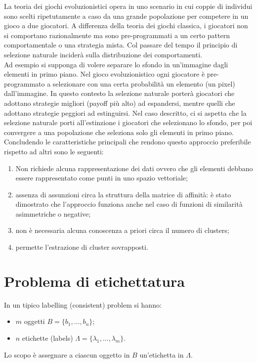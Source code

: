 	La teoria dei giochi evoluzionistici opera in uno scenario in cui coppie di individui sono scelti ripetutamente a caso da una grande popolazione per competere in un gioco a due giocatori. A differenza della teoria dei giochi classica, i giocatori non si comportano razionalmente ma sono pre-programmati a un certo pattern comportamentale o una strategia mista. Col passare del tempo il principio di selezione naturale inciderà sulla distribuzione dei comportamenti.\\

	Ad esempio si supponga di volere separare lo sfondo in un'immagine dagli elementi in primo piano. Nel gioco evoluzionistico ogni giocatore è pre-programmato a selezionare con una certa probabilità un elemento (un pixel) dall'immagine. In questo contesto la selezione naturale porterà giocatori che adottano strategie migliori (payoff più alto) ad espandersi, mentre quelli che adottano strategie peggiori ad estinguirsi. Nel caso descritto, ci si aspetta che la selezione naturale porti all'estinzione i giocatori che selezionano lo sfondo, per poi convergere a una popolazione che seleziona solo gli elementi in primo piano.\\

	Concludendo le caratteristiche principali che rendono questo approccio preferibile rispetto ad altri sono le seguenti:
	\begin{enumerate}
		\item Non richiede alcuna rappresentazione dei dati ovvero che gli elementi debbano essere rappresentato come punti in uno spazio vettoriale;
		\item assenza di assunzioni circa la struttura della matrice di affinità: è stato dimostrato che l'approccio funziona anche nel caso di funzioni di similarità asimmetriche o negative;
		\item non è necessaria alcuna conoscenza a priori circa il numero di clusters;
		\item permette l'estrazione di cluster sovrapposti.
	\end{enumerate}

	
	
	\section{Problema di etichettatura} %
	\label{sec:problema_di_etichettatura}
	In un tipico labelling (consistent) problem si hanno:
	\begin{itemize}
		\item $m$ oggetti $B= \{b_1, \dots, b_n\}$;
		\item $n$ etichette (labels) $\Lambda = \{\lambda_1, \dots, \lambda_m\}$.
	\end{itemize} 
	Lo scopo è assegnare a ciascun oggetto in $B$ un'etichetta in $\Lambda$.\\
	
